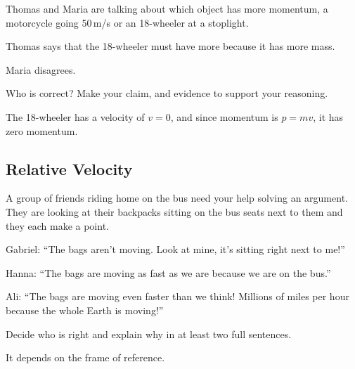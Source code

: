 \documentclass[]{exam}
\begin{document}
\begin{questions}
 
\question %
Thomas and Maria are talking about which object has more momentum, a motorcycle going 50\,m/s or an 18-wheeler at a stoplight. 

Thomas says that the 18-wheeler must have more because it has more mass. 

Maria disagrees. 

Who is correct? Make your claim, and evidence to support your reasoning.

\ifprintanswers
\else
\fillwithlines{21mm}
\fi

\begin{solution}
    The 18-wheeler has a velocity of $v = 0$, and since momentum is $p = mv$, it has zero momentum. 
\end{solution}

\clearpage
\begin{EnvUplevel}
    \subsection{Relative Velocity}
\end{EnvUplevel}

\question
A group of friends riding home on the bus need your help solving an argument. They are looking at their backpacks sitting on the bus seats next to them and they each make a point. 

Gabriel: ``The bags aren't moving. Look at mine, it’s sitting right next to me!''

Hanna: ``The bags are moving as fast as we are because we are on the bus.''

Ali: ``The bags are moving even faster than we think! Millions of miles per hour because the whole Earth is moving!''

Decide who is right and explain why in at least two full sentences.

\begin{solution}
    It depends on the frame of reference.
\end{solution}



\end{questions}
\end{document}
